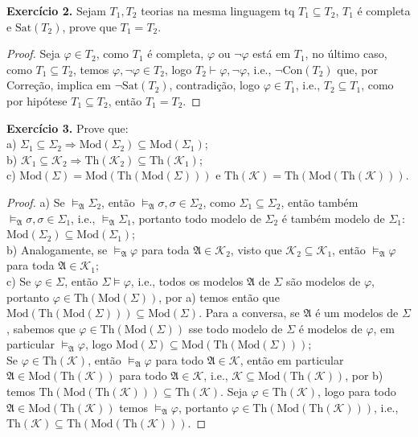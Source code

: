 \documentclass[11pt]{article}
\newcommand{\mc}[1]{\mathcal{#1}}
\newcommand{\mf}[1]{\mathfrak{#1}}
\begin{document}
\begin{shaded}
\textbf{Exercício 2.} Sejam $T_1,T_2$ teorias na mesma linguagem tq $T_1\subseteq T_2$, $T_1$ é completa e $\text{Sat}(T_2)$, prove que $T_1=T_2$.
\end{shaded}

\begin{proof}
    Seja $\varphi\in T_2$, como $T_1$ é completa, $\varphi$ ou $\neg\varphi$ está em $T_1$, no último caso, como $T_1\subseteq T_2$, temos $\varphi,\neg\varphi\in T_2$, logo $T_2\vdash\varphi,\neg\varphi$, i.e., $\neg\text{Con}(T_2)$ que, por Correção, implica em $\neg\text{Sat}(T_2)$, contradição, logo $\varphi\in T_1$, i.e., $T_2\subseteq T_1$, como por hipótese $T_1\subseteq T_2$, então $T_1=T_2$.
\end{proof}

\begin{shaded}
\textbf{Exercício 3.} Prove que:\\
a) $\Sigma_1\subseteq\Sigma_2\Rightarrow\text{Mod}(\Sigma_2)\subseteq\text{Mod}(\Sigma_1)$;\\
b) $\mc{K}_1\subseteq\mc{K}_2\Rightarrow\text{Th}(\mc{K}_2)\subseteq\text{Th}(\mc{K}_1)$;\\
c) $\text{Mod}(\Sigma)=\text{Mod}(\text{Th}(\text{Mod}(\Sigma)))$ e $\text{Th}(\mc{K})=\text{Th}(\text{Mod}(\text{Th}(\mc{K})))$.
\end{shaded}

\begin{proof}
    a) Se $\vDash_\mf{A}\Sigma_2$, então $\vDash_\mf{A}\sigma,\sigma\in\Sigma_2$, como $\Sigma_1\subseteq\Sigma_2$, então também $\vDash_\mf{A}\sigma,\sigma\in\Sigma_1$, i.e., $\vDash_\mf{A}\Sigma_1$, portanto todo modelo de $\Sigma_2$ é também modelo de $\Sigma_1$: $\text{Mod}(\Sigma_2)\subseteq\text{Mod}(\Sigma_1)$;\\
    b) Analogamente, se $\vDash_\mf{A}\varphi$ para toda $\mf{A}\in\mc{K}_2$, visto que $\mc{K}_2\subseteq\mc{K}_1$, então $\vDash_\mf{A}\varphi$ para toda $\mf{A}\in\mc{K}_1$;\\
    c) Se $\varphi\in\Sigma$, então $\Sigma\vDash\varphi$, i.e., todos os modelos $\mf{A}$ de $\Sigma$ são modelos de $\varphi$, portanto $\varphi\in\text{Th}(\text{Mod}(\Sigma))$, por a) temos então que $\text{Mod}(\text{Th}(\text{Mod}(\Sigma)))\subseteq\text{Mod}(\Sigma)$. Para a conversa, se $\mf{A}$ é um modelos de $\Sigma$, sabemos que $\varphi\in\text{Th}(\text{Mod}(\Sigma))$ sse todo modelo de $\Sigma$ é modelos de $\varphi$, em particular $\vDash_\mf{A}\varphi$, logo $\text{Mod}(\Sigma)\subseteq\text{Mod}(\text{Th}(\text{Mod}(\Sigma)))$;\\
    Se $\varphi\in\text{Th}(\mc{K})$, então $\vDash_\mf{A}\varphi$ para todo $\mf{A}\in\mc{K}$, então em particular $\mf{A}\in\text{Mod}(\text{Th}(\mc{K}))$ para todo $\mf{A}\in\mc{K}$, i.e., $\mc{K}\subseteq\text{Mod}(\text{Th}(\mc{K}))$, por b) temos $\text{Th}(\text{Mod}(\text{Th}(\mc{K})))\subseteq\text{Th}(\mc{K})$. Seja $\varphi\in\text{Th}(\mc{K})$, logo para todo $\mf{A}\in\text{Mod}(\text{Th}(\mc{K}))$ temos $\vDash_\mf{A}\varphi$, portanto $\varphi\in\text{Th}(\text{Mod}(\text{Th}(\mc{K})))$, i.e., $\text{Th}(\mc{K})\subseteq\text{Th}(\text{Mod}(\text{Th}(\mc{K})))$.
\end{proof}
\end{document}
